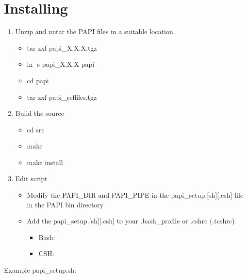 \documentclass[letterpaper,10pt,english]{sphinxmanual}
\begin{document}
\section{Installing}
\label{intro:installing}\begin{enumerate}
\item {} 
Unzip and untar the PAPI files in a suitable location.
\begin{itemize}
\item {} 
tar zxf papi\_X.X.X.tgz

\item {} 
ln -s papi\_X.X.X papi

\item {} 
cd papi

\item {} 
tar zxf papi\_reffiles.tgz

\end{itemize}

\item {} 
Build the source
\begin{itemize}
\item {} 
cd src

\item {} 
make

\item {} 
make install

\end{itemize}

\item {} 
Edit  script
\begin{itemize}
\item {} 
Modify the PAPI\_DIR and PAPI\_PIPE in the papi\_setup.{[}sh{]}{[}.csh{]} file in the PAPI bin directory

\item {} 
Add the papi\_setup.{[}sh{]}{[}.csh{]} to your .bash\_profile or .cshrc (.tcshrc)
\begin{itemize}
\item {} 
Bash: 

\item {} 
CSH: 

\end{itemize}

\end{itemize}

\end{enumerate}

Example papi\_setup.sh:
\end{document}
